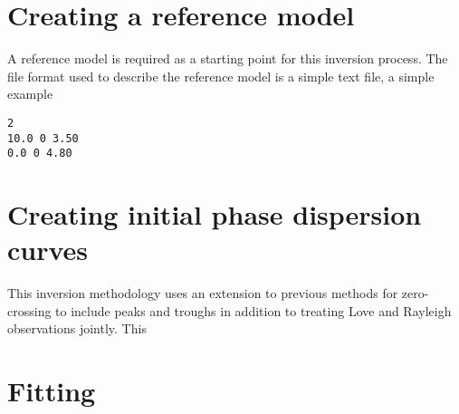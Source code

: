 \documentclass{article}
\begin{document}
\section{Creating a reference model}

A reference model is required as a starting point for this inversion process. The file format used
to describe the reference model is a simple text file, a simple example

\begin{verbatim}
2
10.0 0 3.50
0.0 0 4.80
\end{verbatim}

\section{Creating initial phase dispersion curves}

This inversion methodology uses an extension to previous methods for zero-crossing to include peaks and
troughs in addition to treating Love and Rayleigh observations jointly. This 

\section{Fitting}
\end{document}
